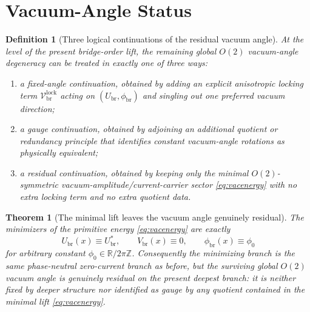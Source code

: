 \documentclass[11pt]{article}
\newcommand{\RespVacAmp}{U_{\mathrm{br}}}
\newcommand{\RespVacEq}{U_{\mathrm{br}}^{\ast}}
\newcommand{\RespVacPhase}{\phi_{\mathrm{br}}}
\newcommand{\RespVacCarrier}{V_{\mathrm{br}}}
\newcommand{\RespVacLock}{\mathscr V_{\mathrm{br}}^{\mathrm{lock}}}
\newtheorem{definition}{Definition}
\newtheorem{theorem}{Theorem}
\begin{document}
\section{Vacuum-Angle Status}

\begin{definition}[Three logical continuations of the residual vacuum angle]
\label{def:vactrichotomy}
At the level of the present bridge-order lift, the remaining global \(O(2)\) vacuum-angle degeneracy can be treated in exactly one of three ways:
\begin{enumerate}
    \item a \emph{fixed-angle continuation}, obtained by adding an explicit anisotropic locking term \(\RespVacLock\) acting on \((\RespVacAmp,\RespVacPhase)\) and singling out one preferred vacuum direction;
    \item a \emph{gauge continuation}, obtained by adjoining an additional quotient or redundancy principle that identifies constant vacuum-angle rotations as physically equivalent;
    \item a \emph{residual continuation}, obtained by keeping only the minimal \(O(2)\)-symmetric vacuum-amplitude/current-carrier sector \eqref{eq:vacenergy} with no extra locking term and no extra quotient data.
\end{enumerate}
\end{definition}

\begin{theorem}[The minimal lift leaves the vacuum angle genuinely residual]
\label{thm:residualangle}
The minimizers of the primitive energy \eqref{eq:vacenergy} are exactly
\begin{equation}
\RespVacAmp(x)\equiv \RespVacEq,
\qquad
\RespVacCarrier(x)\equiv0,
\qquad
\RespVacPhase(x)\equiv \phi_0
\label{eq:vacuumminimizers}
\end{equation}
for arbitrary constant \(\phi_0\in\mathbb R/2\pi\mathbb Z\). Consequently the minimizing branch is the same phase-neutral zero-current branch as before, but the surviving global \(O(2)\) vacuum angle is genuinely residual on the present deepest branch: it is neither fixed by deeper structure nor identified as gauge by any quotient contained in the minimal lift \eqref{eq:vacenergy}.
\end{theorem}
\end{document}
